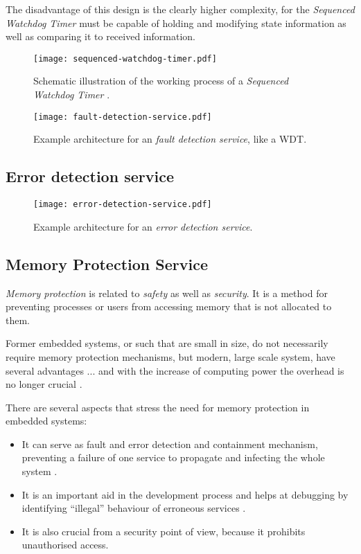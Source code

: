 \begin{description}
The disadvantage of this design is the clearly higher complexity, for the \emph{Sequenced Watchdog Timer} must be capable of holding and modifying state information as well as comparing it to received information.

\begin{figure}[ht]
\centering
\caption{Schematic illustration of the working process of a \emph{Sequenced Watchdog Timer} \cite{elattar2007}.}
\label{fig:sequenced-watchdog-timer}
\texttt{[image: sequenced-watchdog-timer.pdf]}
\end{figure}

\end{description}

\begin{figure}[ht]
\centering
\caption{Example architecture for an \emph{fault detection service}, like a WDT.}
\label{fig:fault-detection-service}
\texttt{[image: fault-detection-service.pdf]}
\end{figure}



\subsection{Error detection service}

\begin{figure}[ht]
\centering
\caption{Example architecture for an \emph{error detection service}.}
\label{fig:error-detection-service}
\texttt{[image: error-detection-service.pdf]}
\end{figure}


\subsection{Memory Protection Service}

\emph{Memory protection} is related to \emph{safety} as well as \emph{security}. It is a method for preventing processes or users from accessing memory that is not allocated to them.

Former embedded systems, or such that are small in size, do not necessarily require memory protection mechanisms, but modern, large scale system, have several advantages ... and with the increase of computing power the overhead is no longer crucial \cite{yamada2008}.

There are several aspects that stress the need for memory protection in embedded systems:
\begin{itemize}
\item It can serve as fault and error detection and containment mechanism, preventing a failure of one service to propagate and infecting the whole system \cite{yamada2008}.
\item It is an important aid in the development process and helps at debugging by identifying ``illegal'' behaviour of erroneous services \cite{yamada2008}.
\item It is also crucial from a security point of view, because it prohibits unauthorised access.
\end{itemize}

